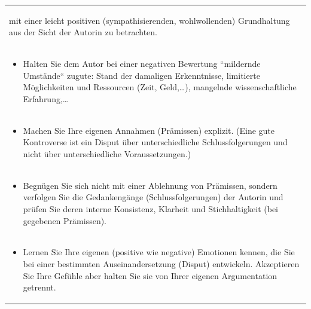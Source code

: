\documentclass[]{book}
\providecommand{\tightlist}{%
  \setlength{\itemsep}{0pt}\setlength{\parskip}{0pt}}
\theoremstyle{definition}
\theoremstyle{definition}
\theoremstyle{definition}
\theoremstyle{remark}
\begin{document}
\begin{longtable}[]{@{}l@{}}
\begin{minipage}[t]{0.97\columnwidth}
\begin{itemize}
  mit einer leicht positiven (sympathisierenden, wohlwollenden)
  Grundhaltung aus der Sicht der Autorin zu betrachten. \vspace{-6mm}
\end{itemize}\strut
\end{minipage}\tabularnewline
\begin{minipage}[t]{0.97\columnwidth}\raggedright\strut
\begin{itemize}
\tightlist
\item
  Halten Sie dem Autor bei einer negativen Bewertung ``mildernde
  Umstände`` zugute: Stand der damaligen Erkenntnisse, limitierte
  Möglichkeiten und Ressourcen (Zeit, Geld,\ldots{}), mangelnde
  wissenschaftliche Erfahrung,\ldots{} \vspace{-6mm}
\end{itemize}\strut
\end{minipage}\tabularnewline
\begin{minipage}[t]{0.97\columnwidth}\raggedright\strut
\begin{itemize}
\tightlist
\item
  Machen Sie Ihre eigenen Annahmen (Prämissen) explizit. (Eine gute
  Kontroverse ist ein Disput über unterschiedliche Schlussfolgerungen
  und nicht über unterschiedliche Voraussetzungen.) \vspace{-6mm}
\end{itemize}\strut
\end{minipage}\tabularnewline
\begin{minipage}[t]{0.97\columnwidth}\raggedright\strut
\begin{itemize}
\tightlist
\item
  Begnügen Sie sich nicht mit einer Ablehnung von Prämissen, sondern
  verfolgen Sie die Gedankengänge (Schlussfolgerungen) der Autorin und
  prüfen Sie deren interne Konsistenz, Klarheit und Stichhaltigkeit (bei
  gegebenen Prämissen). \vspace{-6mm}
\end{itemize}\strut
\end{minipage}\tabularnewline
\begin{minipage}[t]{0.97\columnwidth}\raggedright\strut
\begin{itemize}
\tightlist
\item
  Lernen Sie Ihre eigenen (positive wie negative) Emotionen kennen, die
  Sie bei einer bestimmten Auseinandersetzung (Disput) entwickeln.
  Akzeptieren Sie Ihre Gefühle aber halten Sie sie von Ihrer eigenen
  Argumentation getrennt.
\end{itemize}\strut
\end{minipage}\tabularnewline
\bottomrule
\end{longtable}
\end{document}
